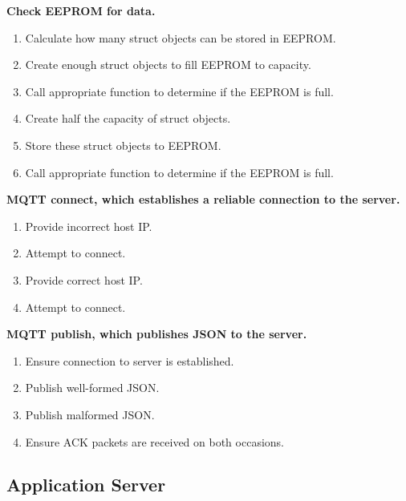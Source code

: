 \documentclass[a4paper,10pt]{article}
\begin{document}
		\textbf{Check EEPROM for data.}
		\begin{enumerate}
			\item Calculate how many struct objects can be stored in EEPROM.
			\item Create enough struct objects to fill EEPROM to capacity.
			\item Call appropriate function to determine if the EEPROM is full.
			\item Create half the capacity of struct objects.
			\item Store these struct objects to EEPROM.
			\item Call appropriate function to determine if the EEPROM is full.
		\end{enumerate}
		\textbf{MQTT connect, which establishes a reliable connection to the server.}
		\begin{enumerate}
			\item Provide incorrect host IP.
			\item Attempt to connect.
			\item Provide correct host IP.
			\item Attempt to connect.
		\end{enumerate}
		\textbf{MQTT publish, which publishes JSON to the server.}
		\begin{enumerate}
			\item Ensure connection to server is established.
			\item Publish well-formed JSON.
			\item Publish malformed JSON.
			\item Ensure ACK packets are received on both occasions.
		\end{enumerate}
		
		\subsection{Application Server}
		
\end{document}
